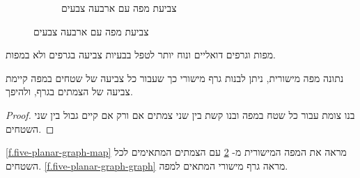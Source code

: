 \begin{figure}[tb]
\begin{center}
\begin{subfigure}{.4\textwidth}
\caption{צביעת מפה עם ארבעה צבעים}\label{f.five-planar-map-four}
\end{subfigure}
\end{center}
\end{figure}
מפות וגרפים דואליים ונוח יותר לטפל בבעיות צביעה בגרפים ולא במפות.
\begin{theorem}
נתונה מפה מישורית, ניתן לבנות גרף מישורי כך שעבור כל צביעה של שטחים במפה קיימת צביעה של הצמתים בגרף, ולהיפך.
\end{theorem}

\begin{proof}
בנו צומת עבור כל שטח במפה ובנו קשת בין שני צמתים אם ורק אם קיים גבול בין שני השטחים.
\end{proof}
\begin{example}
\ref{f.five-planar-graph-map}
מראה את המפה המישורית מ-%
\ref{f.five-planar-map-four}
עם הצמתים המתאימים לכל השטחים. 
\ref{f.five-planar-graph-graph}
מראה גרף מישורי המתאים למפה.
\end{example}

